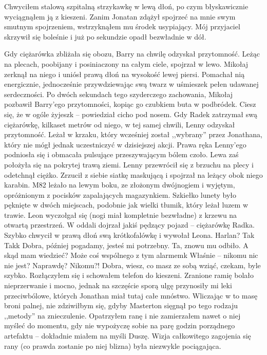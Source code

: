 \documentclass[../MAIN.tex]{subfiles}
\begin{document}
Chwyciłem stalową szpitalną strzykawkę w lewą dłoń, po czym błyskawicznie wyciągnąłem ją z kieszeni. Zanim Jonatan zdążył spojrzeć na mnie swym smutnym spojrzeniem, wstrzyknąłem mu środek usypiający. Mój przyjaciel skrzywił się boleśnie i już po sekundzie opadł bezwładnie w dół.

Gdy ciężarówka zbliżała się obozu, Barry na chwilę odzyskał przytomność. Leżąc na plecach, poobijany i posiniaczony na całym ciele, spojrzał w lewo. Mikołaj zerknął na niego i uniósł prawą dłoń na wysokość lewej piersi. Pomachał nią energicznie, jednocześnie przywdziewając swą twarz w uśmieszek pełen udawanej serdeczności. Po dwóch sekundach tego szyderczego zachowania, Mikołaj pozbawił Barry’ego przytomności, kopiąc go czubkiem buta w podbródek.
\sx Ciesz się, że w ogóle żyjesz\3k -- powiedział cicho pod nosem.
\qd
Gdy Radek zatrzymał swą ciężarówkę, kilkaset metrów od niego, w tej samej chwili, Lenny odzyskał przytomność. Leżał w krzaku, który wcześniej został ,,wybrany'' przez Jonathana, który nie mógł jednak uczestniczyć w dzisiejszej akcji. Prawa ręka Lenny’ego podniosła się i obmacała pulsujące przeszywającym bólem czoło. Lewa zaś położyła się na pokrytej trawą ziemi. Lenny przewrócił się z brzuchu na plecy i odetchnął ciężko. Zrzucił z siebie siatkę maskującą i spojrzał na leżący obok niego karabin. M82 leżało na lewym boku, ze złożonym dwójnogiem i wyjętym, opróżnionym z pocisków zapalających magazynkiem. Szkiełko lunety było pęknięte w dwóch miejscach, podobnie jak wielki tłumik, który leżał luzem w trawie. Leon wyczołgał się (nogi miał kompletnie bezwładne) z krzewu na otwartą przestrzeń. W oddali dojrzał jakiś pędzący pojazd -- ciężarówkę Radka.\\ Szybko chwycił w prawą dłoń swą krótkofalówkę i wywołał Leona.
\sx Harlan? Ta\3k Tak\3k Dobra, później pogadamy, jesteś mi potrzebny. Ta, znowu mu odbiło. A skąd mam wiedzieć? Może coś wspólnego z tym alarmem\3k Właśnie -- nikomu nic nie jest? Naprawdę? Nikomu?! Dobra, wiesz, co masz ze sobą wziąć, czekam, byle szybko.
\qd
Rozłączyłem się i schowałem telefon do kieszeni. Zranione ramię bolało nieprzerwanie i mocno, jednak na szczęście sporą ulgę przynosiły mi leki przeciwbólowe, których Jonathan miał tutaj całe mnóstwo. Wliczając w to masę broni palnej, nie zdziwiłbym się, gdyby Masterton sięgnął po tego rodzaju ,,metody'' na znieczulenie. Opatrzyłem ranę i nie zamierzałem nawet o niej myśleć do momentu, gdy nie wypożyczę sobie na parę godzin porządnego artefaktu -- dokładnie miałem na myśli Duszę. Wizja całkowitego zagojenia się rany (co prawda zostanie po niej blizna) była niezwykle pociągająca.\\
\end{document}

